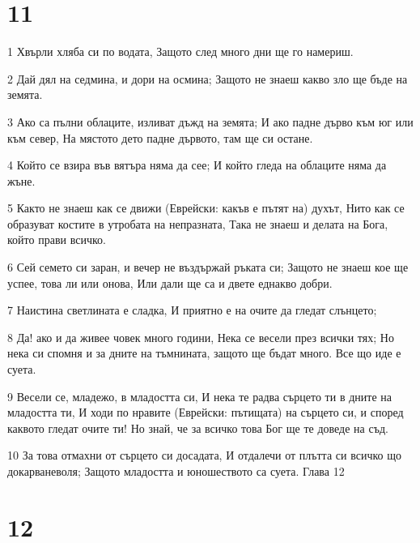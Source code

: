 \chapter{11}

\par 1 Хвърли хляба си по водата, Защото след много дни ще го намериш.
\par 2 Дай дял на седмина, и дори на осмина; Защото не знаеш какво зло ще бъде на земята.
\par 3 Ако са пълни облаците, изливат дъжд на земята; И ако падне дърво към юг или към север, На мястото дето падне дървото, там ще си остане.
\par 4 Който се взира във вятъра няма да сее; И който гледа на облаците няма  да жъне.
\par 5 Както не знаеш как се движи (Еврейски: какъв е пътят на) духът, Нито как се образуват костите в утробата на непразната, Така не знаеш и делата на Бога, който прави всичко.
\par 6 Сей семето си заран, и вечер не въздържай ръката си; Защото не знаеш кое ще успее, това ли или онова, Или дали ще са и двете еднакво добри.
\par 7 Наистина светлината е сладка, И приятно е на очите да гледат слънцето;
\par 8 Да! ако и да живее човек много години, Нека се весели през всички тях; Но нека си спомня и за дните на тъмнината, защото ще бъдат много. Все що иде е суета.
\par 9 Весели се, младежо, в младостта си, И нека те радва сърцето ти в дните на младостта ти, И ходи по нравите (Еврейски: пътищата) на сърцето си, и според каквото гледат очите ти! Но знай, че за всичко това Бог ще те доведе на съд.
\par 10 За това отмахни от сърцето си досадата, И отдалечи от плътта си всичко що докарваневоля; Защото младостта и юношеството са суета. Глава 12

\chapter{12}

